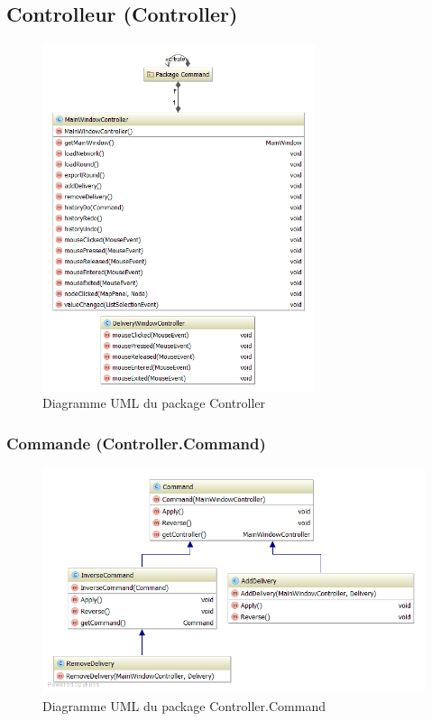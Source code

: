 \subsection{Controlleur (Controller)}

\begin{figure}[h]
    \centering
    \includegraphics[width=80mm]{../diagrams/classes_packages/classes_packages/controller/controller.png}
    \caption{Diagramme UML du package Controller}
    \label{diagram:uml_controller}
\end{figure}
\pagebreak

\subsubsection{Commande (Controller.Command)}

\begin{figure}[h]
    \centering
    \includegraphics[width=160mm]{../diagrams/classes_packages/classes_packages/controller/package_command.png}
    \caption{Diagramme UML du package Controller.Command}
    \label{diagram:uml_controller_command}
\end{figure}

